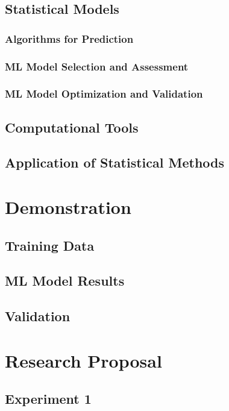 \documentclass[10pt]{beamer}
\begin{document}
\subsection{Statistical Models}

\subsubsection{Algorithms for Prediction}

\subsubsection{ML Model Selection and Assessment}

\subsubsection{ML Model Optimization and Validation}

\subsection{Computational Tools}

\subsection{Application of Statistical Methods}


\section{Demonstration}

\subsection{Training Data}

\subsection{ML Model Results}

\subsection{Validation}


\section{Research Proposal}

\subsection{Experiment 1}

\end{document}

